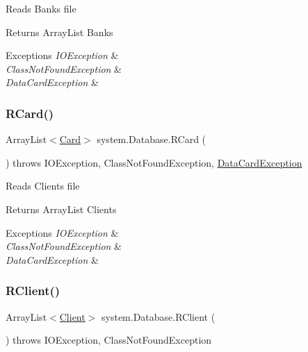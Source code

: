 Reads Banks file \begin{DoxyReturn}{Returns}
Array\+List Banks 
\end{DoxyReturn}

\begin{DoxyExceptions}{Exceptions}
{\em I\+O\+Exception} & \\
\hline
{\em Class\+Not\+Found\+Exception} & \\
\hline
{\em Data\+Card\+Exception} & \\
\hline
\end{DoxyExceptions}
\mbox{\label{classsystem_1_1_database_aa5a502f945de7e737fa11ffedf2a708e}} 
\subsubsection{\texorpdfstring{R\+Card()}{RCard()}}
{\footnotesize\ttfamily Array\+List$<$\mbox{\hyperlink{classmodules_1_1bank_1_1_card}{Card}}$>$ system.\+Database.\+R\+Card (\begin{DoxyParamCaption}{ }\end{DoxyParamCaption}) throws I\+O\+Exception, Class\+Not\+Found\+Exception, \mbox{\hyperlink{classsystem_1_1exceptions_1_1_data_card_exception}{Data\+Card\+Exception}}\hspace{0.3cm}{\ttfamily [inline]}}

Reads Clients file \begin{DoxyReturn}{Returns}
Array\+List Clients 
\end{DoxyReturn}

\begin{DoxyExceptions}{Exceptions}
{\em I\+O\+Exception} & \\
\hline
{\em Class\+Not\+Found\+Exception} & \\
\hline
{\em Data\+Card\+Exception} & \\
\hline
\end{DoxyExceptions}
\mbox{\label{classsystem_1_1_database_a7fa9b0351cb06cb2791c1315363d58ed}} 
\subsubsection{\texorpdfstring{R\+Client()}{RClient()}}
{\footnotesize\ttfamily Array\+List$<$\mbox{\hyperlink{classmodules_1_1_client}{Client}}$>$ system.\+Database.\+R\+Client (\begin{DoxyParamCaption}{ }\end{DoxyParamCaption}) throws I\+O\+Exception, Class\+Not\+Found\+Exception\hspace{0.3cm}{\ttfamily [inline]}}


